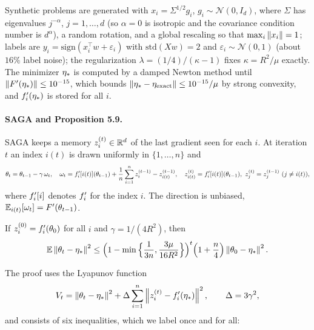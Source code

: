 Synthetic problems are generated with $x_i = \Sigma^{1/2} g_i$, $g_i \sim \mathcal N(0, I_d)$, where $\Sigma$ has
eigenvalues $j^{-\alpha}$, $j = 1, \dots, d$ (so $\alpha = 0$ is isotropic and the covariance condition number is
$d^\alpha$), a random rotation, and a global rescaling so that $\max_i\left\|x_i\right\| = 1$; labels are
$y_i = \mathrm{sign}(x_i^\top w + \varepsilon_i)$ with $\mathrm{std}(Xw) = 2$ and $\varepsilon_i \sim \mathcal N(0,1)$
(about $16\%$ label noise); the regularization $\lambda = (1/4)/(\kappa - 1)$ fixes $\kappa = R^2/\mu$ exactly. The
minimizer $\eta_\ast$ is computed by a damped Newton method until $\left\|F'(\eta_\ast)\right\| \le 10^{-15}$, which bounds
$\left\|\eta_\ast - \eta_{\rm exact}\right\| \le 10^{-15}/\mu$ by strong convexity, and $f'_i(\eta_\ast)$ is stored for all $i$.

\paragraph{SAGA and Proposition 5.9.}
SAGA \cite{defazio2014saga} keeps a memory $z_i^{(t)} \in \mathbb{R}^d$ of the last gradient seen for each $i$. At iteration $t$ an index
$i(t)$ is drawn uniformly in $\{1, \dots, n\}$ and
\begin{equation}\label{eq:saga}
  \theta_t = \theta_{t-1} - \gamma\,\omega_t,\quad
  \omega_t = \fip[i(t)](\theta_{t-1}) + \frac1n\sum_{i=1}^n z_i^{(t-1)} - z_{i(t)}^{(t-1)},\quad
  z_{i(t)}^{(t)} = \fip[i(t)](\theta_{t-1}),\ z_j^{(t)} = z_j^{(t-1)}\ (j \ne i(t)),
\end{equation}
where $f'_i[i]$ denotes $f'_i$ for the index $i$. The direction is unbiased, $\mathbb{E}_{i(t)}[\omega_t] = F'(\theta_{t-1})$.
\begin{proposition}\label{prop:59}
If $z_i^{(0)} = f'_i(\theta_0)$ for all $i$ and $\gamma = 1/(4R^2)$, then
\[
  \mathbb{E}\left\|\theta_t - \eta_\ast\right\|^2 \le \Big(1 - \min\Big\{\frac{1}{3n}, \frac{3\mu}{16R^2}\Big\}\Big)^t \Big(1 + \frac n4\Big)\left\|\theta_0 - \eta_\ast\right\|^2 .
\]
\end{proposition}
The proof uses the Lyapunov function
\begin{equation}\label{eq:lyapunov}
  V_t = \left\|\theta_t - \eta_\ast\right\|^2 + \Delta \sum_{i=1}^n \left\|z_i^{(t)} - f'_i(\eta_\ast)\right\|^2, \qquad \Delta = 3\gamma^2,
\end{equation}
and consists of six inequalities, which we label once and for all:
